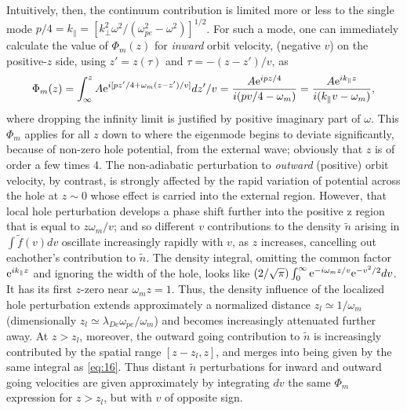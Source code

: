\documentclass[12pt]{article}
\def\etothe#1{{\rm e}^{#1}}
\begin{document}
Intuitively, then, the continuum contribution is limited more or less
to the single mode
$p/4=k_\parallel= [k_\perp^2\omega^2/(\omega_{pe}^2-\omega^2)]^{1/2}$.
For such a mode, one can immediately calculate the value of
$\Phi_m(z)$ for \emph{inward} orbit velocity, (negative $v$) on the
positive-$z$ side, using $z'=z(\tau)$ and $\tau=-(z-z')/v$, as
\begin{equation}
  \label{eq:16}
  \Phi_m(z) = \int_{\infty}^zA{\rm e}^{i[pz'/4+\omega_m
    (z-z')/v]}dz'/v
  ={A{\rm e}^{ipz/4} \over i(pv/4-\omega_m)}={A{\rm e}^{ik_\parallel z} \over
    i(k_\parallel v-\omega_m)},
\end{equation}
where dropping the infinity limit is justified by positive imaginary
part of $\omega$.  This $\Phi_m$ applies for all $z$ down to where the
eigenmode begins to deviate significantly, because of non-zero hole
potential, from the external wave; obviously that $z$ is of order a
few times 4. The non-adiabatic perturbation to \emph{outward}
(positive) orbit velocity, by contrast, is strongly affected by the
rapid variation of potential across the hole at $z\sim 0$ whose effect
is carried into the external region. However, that local hole
perturbation develops a phase shift further into the positive z region
that is equal to $z\omega_m/v$; and so different $v$ contributions to
the density $\tilde n$ arising in $\int \tilde f(v) dv$ oscillate
increasingly rapidly with $v$, as $z$ increases, cancelling out
eachother's contribution to $\tilde n$. The density integral, omitting the
common factor $\etothe{ik_\parallel z}$ and ignoring the width of the
hole, looks like
$(2/\sqrt{\pi})\int_0^\infty \etothe{-i\omega_m
  z/v}\etothe{-v^2/2}dv$.  It has its first $z$-zero near
$\omega_m z=1$. Thus, the density influence of the localized hole
perturbation extends approximately a normalized distance
$z_l\simeq 1/\omega_m$ (dimensionally
$z_l\simeq \lambda_{De}\omega_{pe}/\omega_m$) and becomes increasingly
attenuated further away. At $z>z_l$, moreover, the outward going
contribution to $\tilde n$ is increasingly contributed by the spatial
range $[z-z_l,z]$, and merges into being given by the same integral as
\ref{eq:16}.  Thus distant $\tilde n$ perturbations for inward and
outward going velocities are given approximately by integrating $dv$
the same $\Phi_m$ expression for $z>z_l$, but with $v$ of opposite
sign.
\end{document}
